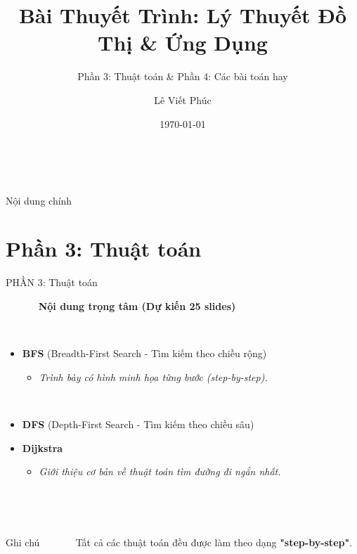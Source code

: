 \documentclass[11pt]{beamer}
\title[Lý Thuyết Đồ Thị]{Bài Thuyết Trình: Lý Thuyết Đồ Thị \& Ứng Dụng}
\subtitle{Phần 3: Thuật toán \& Phần 4: Các bài toán hay}
\author[Lê Viết Phúc]{Lê Viết Phúc} %
\date{\today}
\begin{document}
\begin{frame}
    \titlepage
\end{frame}

\begin{frame}{Nội dung chính}
    \tableofcontents
\end{frame}

\section{Phần 3: Thuật toán}

\begin{frame}{ PHẦN 3: Thuật toán}
    \begin{center}
        \Large \textbf{Nội dung trọng tâm (Dự kiến 25 slides)}
    \end{center}
    \vspace{0.5cm}
    \begin{itemize}
        \item[$\bullet$] \textbf{BFS} (Breadth-First Search - Tìm kiếm theo chiều rộng)
        \begin{itemize}
        \item \textit{Trình bày có hình minh họa từng bước (step-by-step).}
        \end{itemize}
        \vspace{0.3cm}
        \item[$\bullet$] \textbf{DFS} (Depth-First Search - Tìm kiếm theo chiều sâu)
        \vspace{0.3cm}
        \item[$\bullet$] \textbf{Dijkstra}
        \begin{itemize}
        \item \textit{Giới thiệu cơ bản về thuật toán tìm đường đi ngắn nhất.}
        \end{itemize}
    \end{itemize}
    
    \vspace{0.5cm}
    \begin{block}{Ghi chú}
         Tất cả các thuật toán đều được làm theo dạng \textbf{"step-by-step"}.
    \end{block}
\end{frame}
\end{document}
